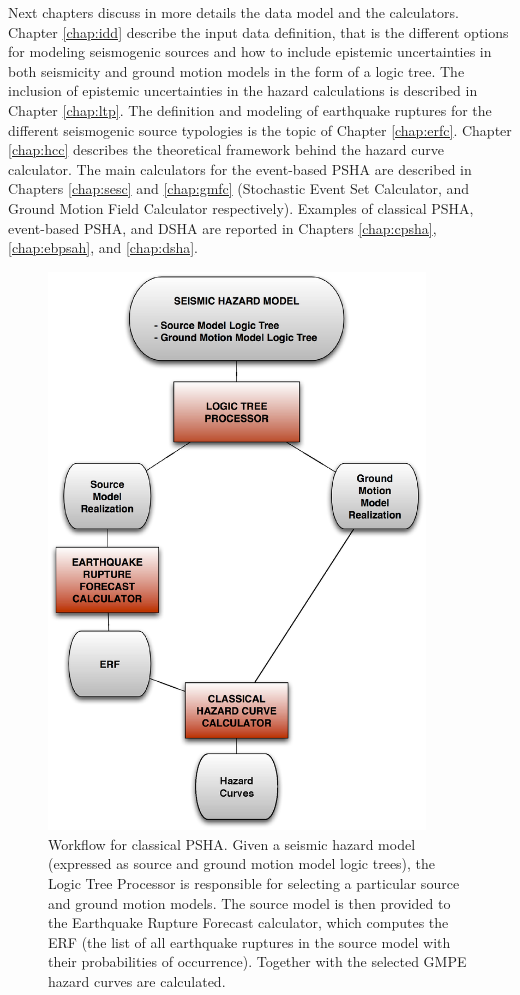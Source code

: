 Next chapters discuss in more details the data model and the calculators. Chapter \ref{chap:idd} describe the input data definition, that is the different options for modeling seismogenic sources and how to include epistemic uncertainties in both seismicity and ground motion models in the form of a logic tree. The inclusion of epistemic uncertainties in the hazard calculations is described in Chapter \ref{chap:ltp}. The definition and modeling of earthquake ruptures for the different seismogenic source typologies is the topic of Chapter \ref{chap:erfc}. Chapter \ref{chap:hcc} describes the theoretical framework behind the hazard curve calculator. The main calculators for the event-based PSHA are described in Chapters \ref{chap:sesc} and \ref{chap:gmfc} (Stochastic Event Set Calculator, and Ground Motion Field Calculator respectively). Examples of classical PSHA, event-based PSHA, and DSHA are reported in Chapters \ref{chap:cpsha}, \ref{chap:ebpsah}, and \ref{chap:dsha}.
\begin{figure}[htbp]
\begin{center}
\includegraphics[width=10cm]{./Figures/Part_Hazard/classical_psha_workflow.eps}
\caption{Workflow for classical PSHA. Given a seismic hazard model (expressed as source and ground motion model logic trees), the Logic Tree Processor is responsible for selecting a particular source and ground motion models. The source model is then provided to the Earthquake Rupture Forecast calculator, which computes the ERF (the list of all earthquake ruptures in the source model with their probabilities of occurrence). Together with the selected GMPE hazard curves are calculated.}
\label{classical_psha_workflow}
\end{center}
\end{figure}
